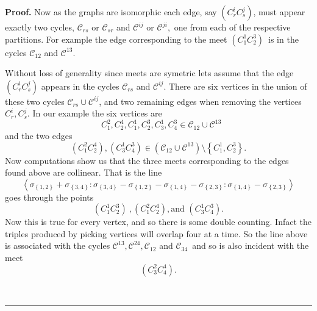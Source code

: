 \documentclass{unswthesis}
\newenvironment{proof}[1][Proof]{\noindent\textbf{#1.} }{\ \rule{0.5em}{0.5em}}
\begin{document}
\begin{proof}
Now as the graphs are isomorphic each edge, say $\left(
C_{r}^{i}C_{s}^{j}\right) $, must appear exactly two cycles, $\mathcal{C}%
_{rs}$ or $\mathcal{C}_{sr}$ and $\mathcal{C}^{ij}$ or $\mathcal{C}^{ji}$,\
one from each of the respective partitions. For example the edge
corresponding to the meet $\left( C_{1}^{1}C_{2}^{3}\right) $\ is in the
cycles $\mathcal{C}_{12}$ and $\mathcal{C}^{13}$.

Without loss of generality since meets are symetric lets assume that the
edge $\left( C_{r}^{i}C_{s}^{j}\right) $ appears in the cycles $\mathcal{C}%
_{rs}$ and $\mathcal{C}^{ij}$. There are six vertices in the union of these
two cycles $\mathcal{C}_{rs}\cup \mathcal{C}^{ij}$, and two remaining edges
when removing the vertices $C_{r}^{i},C_{s}^{j}$. In our example the six
vertices are%
\begin{equation*}
\text{ }C_{1}^{2},C_{2}^{4},C_{1}^{1},C_{2}^{3},C_{3}^{1},C_{4}^{3}\in 
\mathcal{C}_{12}\cup \mathcal{C}^{13} 
\end{equation*}%
and the two edges%
\begin{equation*}
\left( C_{1}^{2}C_{2}^{4}\right) ,\left( C_{3}^{1}C_{4}^{3}\right) \in
\left( \mathcal{C}_{12}\cup \mathcal{C}^{13}\right) \setminus \left\{
C_{1}^{1},C_{2}^{3}\right\} . 
\end{equation*}%
Now computations show us that the three meets corresponding to the edges
found above are collinear. That is the line%
\begin{equation*}
\left\langle \sigma _{\left\{ 1,2\right\} }+\sigma _{\left\{ 3,4\right\}
}:\sigma _{\left\{ 3,4\right\} }-\sigma _{\left\{ 1,2\right\} }-\sigma
_{\left\{ 1,4\right\} }-\sigma _{\left\{ 2,3\right\} }:\sigma _{\left\{
1,4\right\} }-\sigma _{\left\{ 2,3\right\} }\right\rangle 
\end{equation*}%
goes through the points%
\begin{equation*}
\left( C_{1}^{1}C_{2}^{3}\right) \ ,\left( C_{1}^{2}C_{2}^{4}\right) ,\text{
and }\left( C_{3}^{1}C_{4}^{3}\right) . 
\end{equation*}%
Now this is true for every vertex, and so there is some double counting.
Infact the triples produced by picking vertices will overlap four at a time.
So the line above is associated with the cycles $\mathcal{C}^{13},\mathcal{C}%
^{24},\mathcal{C}_{12}$ and $\mathcal{C}_{34}$\ and so is also incident with
the meet%
\begin{equation*}
\left( C_{3}^{2}C_{4}^{4}\right) . 
\end{equation*}%

\end{proof}
\end{document}
